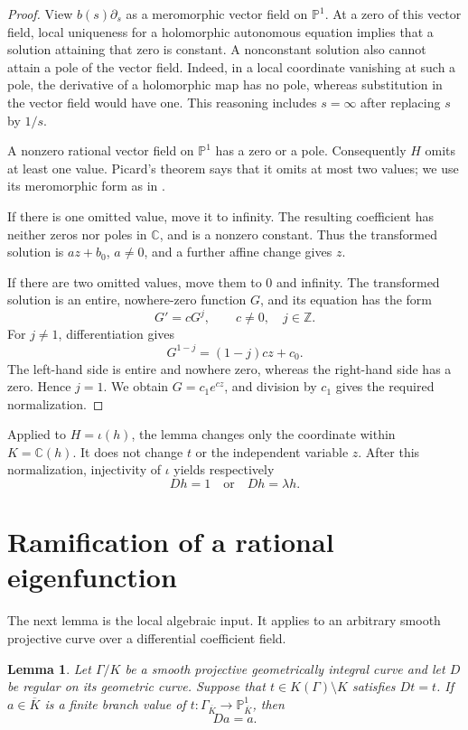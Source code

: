\documentclass[11pt,reqno]{amsart}
\numberwithin{equation}{section}
\newtheorem{lemma}[theorem]{Lemma}
\theoremstyle{definition}
\theoremstyle{remark}
\newcommand{\C}{\mathbb C}
\newcommand{\Z}{\mathbb Z}
\newcommand{\PP}{\mathbb P}
\begin{document}
\begin{proof}
View $b(s)\partial_s$ as a meromorphic vector field on $\PP^1$.
At a zero of this vector field, local uniqueness for a holomorphic
autonomous equation implies that a solution attaining that zero is
constant. A nonconstant solution also cannot attain a pole of the
vector field. Indeed, in a local coordinate vanishing at such a pole,
the derivative of a holomorphic map has no pole, whereas substitution
in the vector field would have one. This reasoning includes $s=\infty$
after replacing $s$ by $1/s$.

A nonzero rational vector field on $\PP^1$ has a zero or a pole.
Consequently $H$ omits at least one value. Picard's theorem says that
it omits at most two values; we use its meromorphic form as in
\cite{Hayman1964,Laine1993}.

If there is one omitted value, move it to infinity. The resulting
coefficient has neither zeros nor poles in $\C$, and is a nonzero
constant. Thus the transformed solution is $az+b_0$, $a\ne0$, and a
further affine change gives $z$.

If there are two omitted values, move them to $0$ and infinity. The
transformed solution is an entire, nowhere-zero function $G$, and its
equation has the form
\[
 G'=cG^j,\qquad c\ne0,\quad j\in\Z.
\]
For $j\ne1$, differentiation gives
\[
 G^{1-j}=(1-j)cz+c_0.
\]
The left-hand side is entire and nowhere zero, whereas the right-hand
side has a zero. Hence $j=1$. We obtain $G=c_1e^{cz}$, and division
by $c_1$ gives the required normalization.
\end{proof}

Applied to $H=\iota(h)$, the lemma changes only the coordinate within
$K=\C(h)$. It does not change $t$ or the independent variable $z$.
After this normalization, injectivity of $\iota$ yields respectively
\begin{equation}
 Dh=1\quad\text{or}\quad Dh=\lambda h.
 \label{eq:base-normal-forms}
\end{equation}

\section{Ramification of a rational eigenfunction}
\label{sec:ramification}

The next lemma is the local algebraic input. It applies to an arbitrary
smooth projective curve over a differential coefficient field.

\begin{lemma}
\label{lem:branch}
Let $\Gamma/K$ be a smooth projective geometrically integral curve and
let $D$ be regular on its geometric curve. Suppose that
$t\in K(\Gamma)\setminus K$ satisfies $Dt=t$. If
$a\in\overline K$ is a finite branch value of
$t:\Gamma_{\overline K}\to\PP^1_{\overline K}$, then
\begin{equation}
 Da=a.
 \label{eq:branch-equation}
\end{equation}
\end{lemma}
\end{document}
